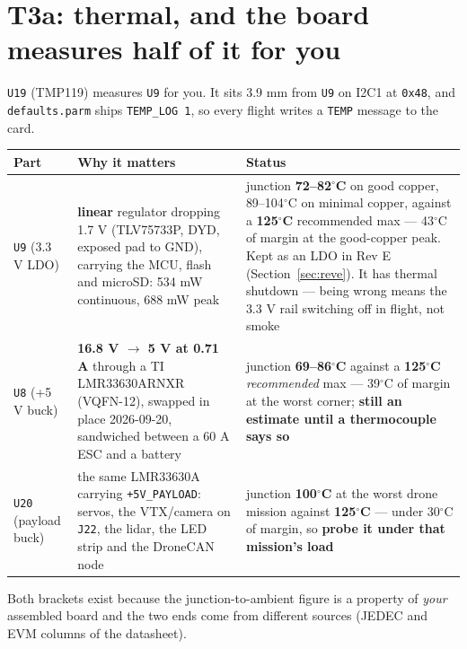 \documentclass[11pt,a4paper]{article}
\newcommand{\file}[1]{\texttt{\small #1}}
\newcommand{\flag}[1]{\textcolor{warnred}{\textbf{#1}}}
\newcommand{\degC}{$^\circ$C}
\begin{document}
\section{T3a: thermal, and the board measures half of it for you}

\file{U19} (TMP119) measures \file{U9} for you. It sits 3.9 mm from \file{U9} on I2C1 at
\file{0x48}, and \file{defaults.parm} ships \file{TEMP\_LOG 1}, so every flight writes a
\file{TEMP} message to the card.

\begin{center}
\begin{tabular}{@{}p{}p{}p{}@{}}
\toprule
\textbf{Part} & \textbf{Why it matters} & \textbf{Status} \\
\midrule
\file{U9} (3.3 V LDO) & \textbf{linear} regulator dropping 1.7 V (TLV75733P, DYD, exposed pad
to GND), carrying the MCU, flash and microSD: 534 mW continuous, 688 mW peak & junction
\textbf{72--82\degC} on good copper, 89--104\degC{} on minimal copper, against a
\textbf{125\degC} recommended max --- 43\degC{} of margin at the good-copper peak. Kept as an
LDO in Rev E (Section~\ref{sec:reve}). It has thermal shutdown --- being wrong means the
3.3 V rail switching off in flight, not smoke \\
\file{U8} (+5 V buck) & \textbf{16.8 V $\rightarrow$ 5 V at 0.71 A} through a TI
LMR33630ARNXR (VQFN-12), swapped in place 2026-09-20, sandwiched between a 60 A ESC and a
battery & junction \textbf{69--86\degC} against a \textbf{125\degC} \emph{recommended} max
--- 39\degC{} of margin at the worst corner; \flag{still an estimate until a thermocouple
says so} \\
\file{U20} (payload buck) & the same LMR33630A carrying \file{+5V\_PAYLOAD}: servos, the
VTX/camera on \file{J22}, the lidar, the LED strip and the DroneCAN node & junction
\textbf{100\degC} at the worst drone mission against \textbf{125\degC} --- under 30\degC{} of
margin, so \flag{probe it under that mission's load} \\
\bottomrule
\end{tabular}
\end{center}

Both brackets exist because the junction-to-ambient figure is a property of \emph{your}
assembled board and the two ends come from different sources (JEDEC and EVM columns of the
datasheet).
\end{document}
